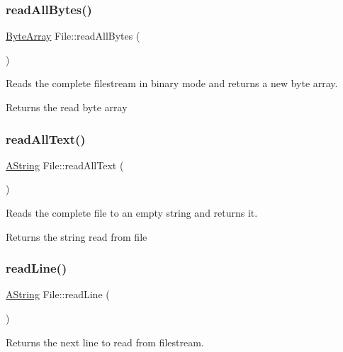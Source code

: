 \subsubsection{\texorpdfstring{readAllBytes()}{readAllBytes()}}
{\footnotesize\ttfamily \mbox{\hyperlink{class_byte_array}{Byte\+Array}} File\+::read\+All\+Bytes (\begin{DoxyParamCaption}{ }\end{DoxyParamCaption})}



Reads the complete filestream in binary mode and returns a new byte array. 

\begin{DoxyReturn}{Returns}
the read byte array 
\end{DoxyReturn}
\mbox{\label{class_file_ad835c603c110f5e5d8359a9b271298dd}} 
\subsubsection{\texorpdfstring{readAllText()}{readAllText()}}
{\footnotesize\ttfamily \mbox{\hyperlink{class_a_string}{A\+String}} File\+::read\+All\+Text (\begin{DoxyParamCaption}{ }\end{DoxyParamCaption})}



Reads the complete file to an empty string and returns it. 

\begin{DoxyReturn}{Returns}
the string read from file 
\end{DoxyReturn}
\mbox{\label{class_file_ad65ed49713d0b0e11a439cb3bc148171}} 
\subsubsection{\texorpdfstring{readLine()}{readLine()}}
{\footnotesize\ttfamily \mbox{\hyperlink{class_a_string}{A\+String}} File\+::read\+Line (\begin{DoxyParamCaption}{ }\end{DoxyParamCaption})}



Returns the next line to read from filestream. 

